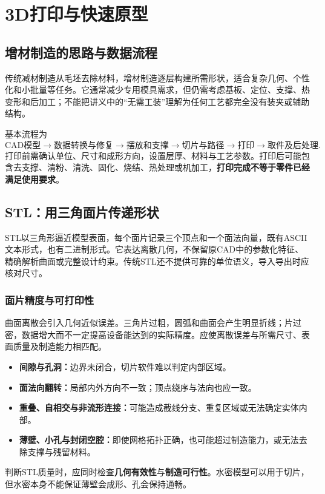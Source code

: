 \chapter{3D打印与快速原型}
\label{chap:additive-manufacturing}
\label{ch:additive}


\section{增材制造的思路与数据流程}

传统减材制造从毛坯去除材料，增材制造逐层构建所需形状，适合复杂几何、个性化和小批量等任务。它通常减少专用模具需求，但仍需考虑基板、定位、支撑、热变形和后加工；不能把讲义中的“无需工装”理解为任何工艺都完全没有装夹或辅助结构。

基本流程为
\[
\text{CAD模型}\to\text{数据转换与修复}\to\text{摆放和支撑}
\to\text{切片与路径}\to\text{打印}\to\text{取件及后处理}.
\]
打印前需确认单位、尺寸和成形方向，设置层厚、材料与工艺参数。打印后可能包含去支撑、清粉、清洗、固化、烧结、热处理或机加工，\textbf{打印完成不等于零件已经满足使用要求}。

\section{STL：用三角面片传递形状}
STL以三角形逼近模型表面，每个面片记录三个顶点和一个面法向量，既有ASCII文本形式，也有二进制形式。它表达离散几何，不保留原CAD中的参数化特征、精确解析曲面或完整设计约束。传统STL还不提供可靠的单位语义，导入导出时应核对尺寸。

\subsection{面片精度与可打印性}
曲面离散会引入几何近似误差。三角片过粗，圆弧和曲面会产生明显折线；片过密，数据增大而不一定提高设备能达到的实际精度。应使离散误差与所需尺寸、表面质量及制造能力相匹配。

\begin{itemize}
\item \textbf{间隙与孔洞：}边界未闭合，切片软件难以判定内部区域。
\item \textbf{面法向翻转：}局部内外方向不一致；顶点绕序与法向也应一致。
\item \textbf{重叠、自相交与非流形连接：}可能造成截线分支、重复区域或无法确定实体内部。
\item \textbf{薄壁、小孔与封闭空腔：}即使网格拓扑正确，也可能超过制造能力，或无法去除支撑与残留材料。
\end{itemize}
判断STL质量时，应同时检查\textbf{几何有效性}与\textbf{制造可行性}。水密模型可以用于切片，但水密本身不能保证薄壁会成形、孔会保持通畅。

